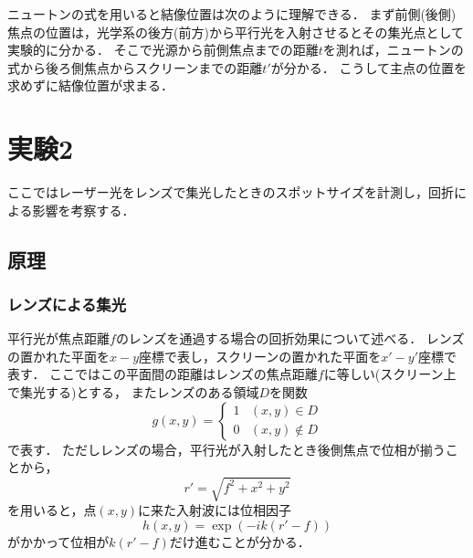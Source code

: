 \documentclass[titlepage]{jsarticle}
\begin{document}
ニュートンの式を用いると結像位置は次のように理解できる．
まず前側(後側)焦点の位置は，光学系の後方(前方)から平行光を入射させるとその集光点として実験的に分かる．
そこで光源から前側焦点までの距離$t$を測れば，ニュートンの式から後ろ側焦点からスクリーンまでの距離$t'$が分かる．
こうして主点の位置を求めずに結像位置が求まる．

\section{実験2}
ここではレーザー光をレンズで集光したときのスポットサイズを計測し，回折による影響を考察する．

\subsection{原理}
\subsubsection{レンズによる集光}
平行光が焦点距離$f$のレンズを通過する場合の回折効果について述べる．
レンズの置かれた平面を$x-y$座標で表し，スクリーンの置かれた平面を$x'-y'$座標で表す．
ここではこの平面間の距離はレンズの焦点距離$f$に等しい(スクリーン上で集光する)とする，
またレンズのある領域$D$を関数
\begin{equation}
    g(x,y) = \left\{\begin{array}{ll}
        1 & (x,y)\in D \\
        0 & (x,y)\notin D
    \end{array}\right.
\end{equation}
で表す．
ただしレンズの場合，平行光が入射したとき後側焦点で位相が揃うことから，
\begin{equation}
    r' = \sqrt{f^2 + x^2 + y^2}
\end{equation}
を用いると，点$(x,y)$に来た入射波には位相因子
\begin{equation}
    h(x,y) = \exp{(-ik(r'-f))}
\end{equation}
がかかって位相が$k(r'-f)$だけ進むことが分かる．
\end{document}
